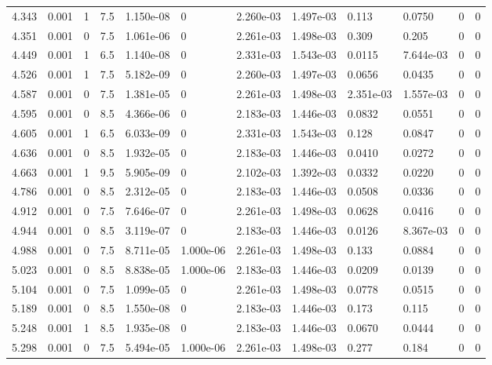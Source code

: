 \documentclass[preview]{standalone}
\begin{document}
{{{\begin{tabular}{L{1.2cm}C{1.2cm} C{0.3cm}C{0.5cm} C{1.4cm}C{1.4cm} C{1.4cm}C{1.4cm} C{1.6cm}C{1.6cm} C{1.6cm}C{1.6cm}}
  4.343  &  0.001  & 1     & 7.5 &  1.150e-08  & 0  &  2.260e-03&   1.497e-03& 0.113 & 0.0750   &  0 & 0  \\ 
  4.351  &  0.001  & 0     & 7.5 &  1.061e-06  & 0  &  2.261e-03&   1.498e-03& 0.309 & 0.205   &  0 & 0  \\ 
  4.449  &  0.001  & 1     & 6.5 &  1.140e-08  & 0  &  2.331e-03&   1.543e-03& 0.0115 & 7.644e-03   &  0 & 0  \\ 
  4.526  &  0.001  & 1     & 7.5 &  5.182e-09  & 0  &  2.260e-03&   1.497e-03& 0.0656 & 0.0435   &  0 & 0  \\ 
  4.587  &  0.001  & 0     & 7.5 &  1.381e-05  & 0  &  2.261e-03&   1.498e-03& 2.351e-03 & 1.557e-03   &  0 & 0  \\ 
  4.595  &  0.001  & 0     & 8.5 &  4.366e-06  & 0  &  2.183e-03&   1.446e-03& 0.0832 & 0.0551   &  0 & 0  \\ 
  4.605  &  0.001  & 1     & 6.5 &  6.033e-09  & 0  &  2.331e-03&   1.543e-03& 0.128 & 0.0847   &  0 & 0  \\ 
  4.636  &  0.001  & 0     & 8.5 &  1.932e-05  & 0  &  2.183e-03&   1.446e-03& 0.0410 & 0.0272   &  0 & 0  \\ 
  4.663  &  0.001  & 1     & 9.5 &  5.905e-09  & 0  &  2.102e-03&   1.392e-03& 0.0332 & 0.0220   &  0 & 0  \\ 
  4.786  &  0.001  & 0     & 8.5 &  2.312e-05  & 0  &  2.183e-03&   1.446e-03& 0.0508 & 0.0336   &  0 & 0  \\ 
  4.912  &  0.001  & 0     & 7.5 &  7.646e-07  & 0  &  2.261e-03&   1.498e-03& 0.0628 & 0.0416   &  0 & 0  \\ 
  4.944  &  0.001  & 0     & 8.5 &  3.119e-07  & 0  &  2.183e-03&   1.446e-03& 0.0126 & 8.367e-03   &  0 & 0  \\ 
  4.988  &  0.001  & 0     & 7.5 &  8.711e-05  & 1.000e-06  &  2.261e-03&   1.498e-03& 0.133 & 0.0884   &  0 & 0  \\ 
  5.023  &  0.001  & 0     & 8.5 &  8.838e-05  & 1.000e-06  &  2.183e-03&   1.446e-03& 0.0209 & 0.0139   &  0 & 0  \\ 
  5.104  &  0.001  & 0     & 7.5 &  1.099e-05  & 0  &  2.261e-03&   1.498e-03& 0.0778 & 0.0515   &  0 & 0  \\ 
  5.189  &  0.001  & 0     & 8.5 &  1.550e-08  & 0  &  2.183e-03&   1.446e-03& 0.173 & 0.115   &  0 & 0  \\ 
  5.248  &  0.001  & 1     & 8.5 &  1.935e-08  & 0  &  2.183e-03&   1.446e-03& 0.0670 & 0.0444   &  0 & 0  \\ 
  5.298  &  0.001  & 0     & 7.5 &  5.494e-05  & 1.000e-06  &  2.261e-03&   1.498e-03& 0.277 & 0.184   &  0 & 0  \\ 

\end{tabular}}}}
\end{document}
